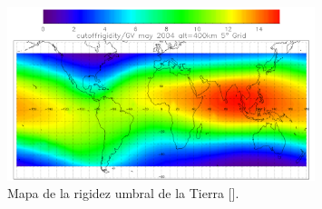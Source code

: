 \begin{frame}{}
\begin{columns}
            \begin{column}{0.6\textwidth} %
                \begin{figure}
                    \includegraphics[width=0.8\textwidth]{Figures/rigiditymap.png}
                    \caption{\tiny Mapa de la rigidez umbral de la Tierra [\cite{labrenz2014}].}
                \end{figure}
            \end{column}
        \end{columns}
    \end{frame}   

